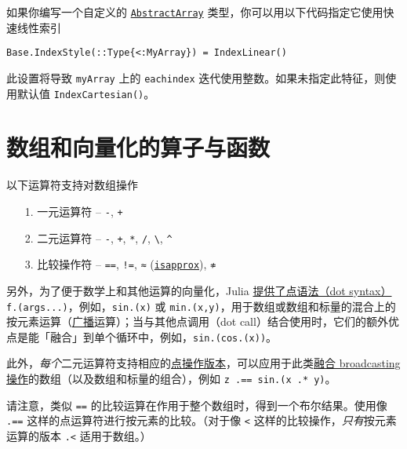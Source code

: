 如果你编写一个自定义的 \hyperlink{6514416309183787338}{\texttt{AbstractArray}} 类型，你可以用以下代码指定它使用快速线性索引




\begin{verbatim}
Base.IndexStyle(::Type{<:MyArray}) = IndexLinear()
\end{verbatim}



此设置将导致 \texttt{myArray} 上的 \texttt{eachindex} 迭代使用整数。如果未指定此特征，则使用默认值 \texttt{IndexCartesian()}。



\hypertarget{1179855062476093403}{}


\section{数组和向量化的算子与函数}



以下运算符支持对数组操作



\begin{itemize}
\item[1. ] 一元运算符 – \texttt{-}, \texttt{+}


\item[2. ] 二元运算符 – \texttt{-}, \texttt{+}, \texttt{*}, \texttt{/}, \texttt{{\textbackslash}}, \texttt{{\textasciicircum}}


\item[3. ] 比较操作符 – \texttt{==}, \texttt{!=}, \texttt{≈} (\hyperlink{12499503887608197213}{\texttt{isapprox}}), \texttt{≉}

\end{itemize}


另外，为了便于数学上和其他运算的向量化，Julia \hyperlink{17801130558550430478}{提供了点语法（dot syntax）} \texttt{f.(args...)}，例如，\texttt{sin.(x)} 或 \texttt{min.(x,y)}，用于数组或数组和标量的混合上的按元素运算（\hyperlink{1924664524817847375}{广播}运算）；当与其他点调用（dot call）结合使用时，它们的额外优点是能「融合」到单个循环中，例如，\texttt{sin.(cos.(x))}。



此外，\emph{每个}二元运算符支持相应的\hyperlink{15967322336376951940}{点操作版本}，可以应用于此类\hyperlink{17801130558550430478}{融合 broadcasting 操作}的数组（以及数组和标量的组合），例如 \texttt{z .== sin.(x .* y)}。



请注意，类似 \texttt{==} 的比较运算在作用于整个数组时，得到一个布尔结果。使用像 \texttt{.==} 这样的点运算符进行按元素的比较。（对于像 \texttt{<} 这样的比较操作，\emph{只有}按元素运算的版本 \texttt{.<} 适用于数组。）



